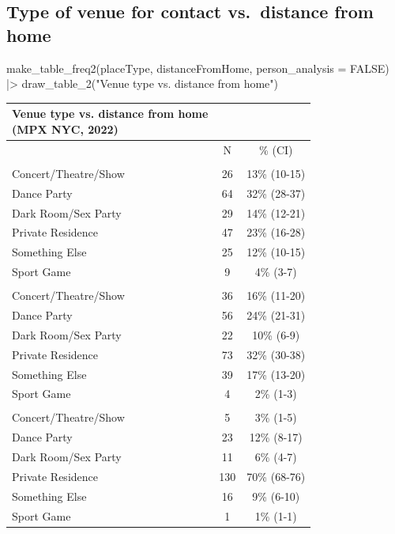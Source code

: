 \documentclass[
  letterpaper,
  DIV=11,
  numbers=noendperiod,
  oneside]{scrreprt}
\newenvironment{Shaded}{\begin{snugshade}}{\end{snugshade}}
\newcommand{\AttributeTok}[1]{\textcolor[rgb]{0.40,0.45,0.13}{#1}}
\newcommand{\ConstantTok}[1]{\textcolor[rgb]{0.56,0.35,0.01}{#1}}
\newcommand{\FunctionTok}[1]{\textcolor[rgb]{0.28,0.35,0.67}{#1}}
\newcommand{\NormalTok}[1]{\textcolor[rgb]{0.00,0.23,0.31}{#1}}
\newcommand{\SpecialCharTok}[1]{\textcolor[rgb]{0.37,0.37,0.37}{#1}}
\newcommand{\StringTok}[1]{\textcolor[rgb]{0.13,0.47,0.30}{#1}}
\begin{document}
\hypertarget{type-of-venue-for-contact-vs.-distance-from-home}{%
\subsection*{Type of venue for contact vs.~distance from
home}\label{type-of-venue-for-contact-vs.-distance-from-home}}

\begin{Shaded}
\begin{Highlighting}[]
\FunctionTok{make\_table\_freq2}\NormalTok{(placeType, distanceFromHome, }\AttributeTok{person\_analysis =} \ConstantTok{FALSE}\NormalTok{) }\SpecialCharTok{|\textgreater{}}
  \FunctionTok{draw\_table\_2}\NormalTok{(}\StringTok{"Venue type vs. distance from home"}\NormalTok{)}
\end{Highlighting}
\end{Shaded}

\begin{longtable*}{lcc}
\caption*{
{\large Venue type vs. distance from home} \\ 
{\small (MPX NYC, 2022)}
} \\ 
\toprule
 & N & \% (CI) \\ 
\midrule\addlinespace[2.5pt]
 \\ 
\midrule\addlinespace[2.5pt]
Concert/Theatre/Show & 26 & 13\% (10-15) \\ 
Dance Party & 64 & 32\% (28-37) \\ 
Dark Room/Sex Party & 29 & 14\% (12-21) \\ 
Private Residence & 47 & 23\% (16-28) \\ 
Something Else & 25 & 12\% (10-15) \\ 
Sport Game & 9 & 4\% (3-7) \\ 
\midrule\addlinespace[2.5pt]
 \\ 
\midrule\addlinespace[2.5pt]
Concert/Theatre/Show & 36 & 16\% (11-20) \\ 
Dance Party & 56 & 24\% (21-31) \\ 
Dark Room/Sex Party & 22 & 10\% (6-9) \\ 
Private Residence & 73 & 32\% (30-38) \\ 
Something Else & 39 & 17\% (13-20) \\ 
Sport Game & 4 & 2\% (1-3) \\ 
\midrule\addlinespace[2.5pt]
 \\ 
\midrule\addlinespace[2.5pt]
Concert/Theatre/Show & 5 & 3\% (1-5) \\ 
Dance Party & 23 & 12\% (8-17) \\ 
Dark Room/Sex Party & 11 & 6\% (4-7) \\ 
Private Residence & 130 & 70\% (68-76) \\ 
Something Else & 16 & 9\% (6-10) \\ 
Sport Game & 1 & 1\% (1-1) \\ 
\bottomrule
\end{longtable*}
\end{document}
